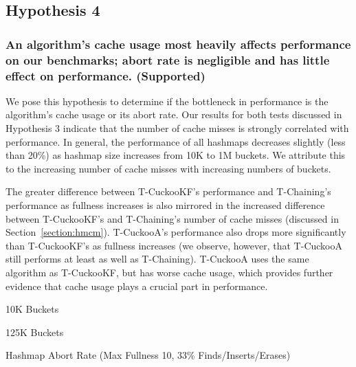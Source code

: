 \vspace{12pt}
\noindent{}


\subsection{Hypothesis 4}
\subsubsection{An algorithm's cache usage most heavily affects performance on our benchmarks; abort rate is negligible and has little effect on performance. (Supported)}

    We pose this hypothesis to determine if the bottleneck in performance is the algorithm's cache usage or its abort rate. 
Our results for both tests discussed in Hypothesis 3 indicate that the number of cache misses is strongly correlated with performance. In general, the performance of all hashmaps decreases slightly (less than 20\%) as hashmap size increases from 10K to 1M buckets. We attribute this to the increasing number of cache misses with increasing numbers of buckets.

The greater difference between T-CuckooKF's performance and T-Chaining's performance as fullness increases is also mirrored in the increased difference between T-CuckooKF's and T-Chaining's number of cache misses (discussed in Section~\ref{section:hmcm}). T-CuckooA's performance also drops more significantly than T-CuckooKF's as fullness increases (we observe, however, that T-CuckooA still performs at least as well as T-Chaining). T-CuckooA uses the same algorithm as T-CuckooKF, but has worse cache usage, which provides further evidence that cache usage plays a crucial part in performance. 

    \begin{table}[t]
    \centering
	\singlespace
        \begin{minipage}{\textwidth}
            \centering
        
        \caption*{10K Buckets}
            \vspace{12pt}
        \end{minipage}
        \begin{minipage}{\textwidth}
            \centering
        
        \caption*{125K Buckets}
        \end{minipage}
        \caption{Hashmap Abort Rate (Max Fullness 10, 33\% Finds/Inserts/Erases)}
		\label{tab:hm_aborts}
    \end{table}

